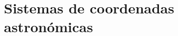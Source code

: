 \renewcommand{\chaptername}{Sistemas de coordenadas astronómicas}
\chapter{Sistemas de coordenadas astronómicas} \label{cap:sist_cord} 
